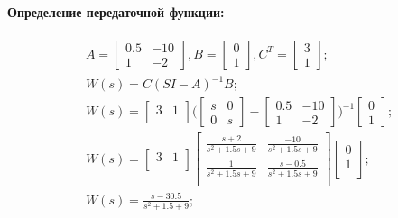 \paragraph{Определение передаточной функции:}
\begin{equation}
	\begin{split}	
	&A = \begin{bmatrix}
				0.5 & -10\\
				1 & -2
				\end{bmatrix}, B = \begin{bmatrix}
									0\\
									1
									\end{bmatrix}, C^T = \begin{bmatrix}
															3\\
															1
															\end{bmatrix};\\
&W(s)=C(SI-A)^{-1}B;\\
&W(s)=\begin{bmatrix}
				3 & 1\\
				\end{bmatrix}\Biggl(\begin{bmatrix}
				s & 0\\
				0 & s
				\end{bmatrix} - \begin{bmatrix}
				0.5 & -10\\
				1 & -2
				\end{bmatrix}\Biggr)^{-1}\begin{bmatrix}
				0\\
				1
				\end{bmatrix};\\
&W(s)=\begin{bmatrix}
3 & 1\\
\end{bmatrix}\begin{bmatrix}
\frac{s+2}{s^2+1.5s+9} & \frac{-10}{s^2+1.5s+9}\\
\frac{1}{s^2+1.5s+9} & \frac{s-0.5}{s^2+1.5s+9}\\
\end{bmatrix}\begin{bmatrix}
0\\
1\\
\end{bmatrix};\\
&W(s)=\frac{s-30.5}{s^2+1.5+9};\\
	\end{split}
\end{equation}

